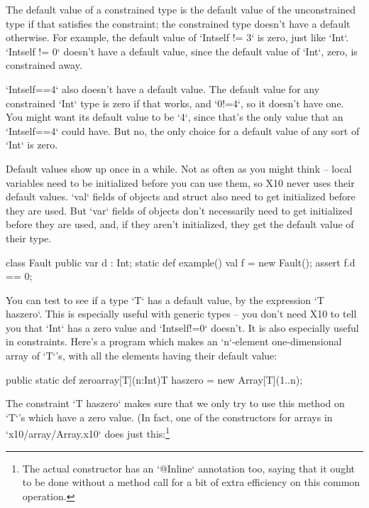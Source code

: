 The default value of a constrained type is the default value of the
unconstrained type if that satisfies the constraint; the constrained type
doesn't have a default otherwise. 
For example, the default value of \xcd`Int{self != 3}` is zero, just like
\xcd`Int`.  \xcd`Int{self != 0}` doesn't have a default value, since the
default value of \xcd`Int`, zero, is constrained away. 

\xcd`Int{self==4}` also doesn't have a default value.  The default value for
any constrained \xcd`Int` type is zero if that works, and \xcd`0!=4`, so it
doesn't have one.  You might want its default value to be \xcd`4`, since
that's the only value that an \xcd`Int{self==4}` could have. But no, the
only choice for a default value of any sort of \xcd`Int` is zero.


Default values show up once in a while.  Not as often as you might think --
local variables need to be initialized before you can use them, so X10 never
uses their default values.  \xcd`val` fields of objects and struct also need
to get initialized before they are used.  But \xcd`var` fields of objects
don't necessarily need to get initialized before they are used, and, if they
aren't initialized, they get the default value of their type.


\begin{xtennum}[]
 class Fault {
  public var d : Int;
  static def example() {
    val f = new Fault();
    assert f.d == 0; 
  }
}
\end{xtennum}


You can test to see if a type \xcd`T` has a default value, by the expression 
\xcd`T haszero`.   This is especially useful with generic types -- you don't
need X10 to tell you that \xcd`Int` has a zero value and \xcd`Int{self!=0}`
doesn't.  It is also especially useful in constraints.  Here's a program which
makes an \xcd`n`-element one-dimensional array of \xcd`T`'s, with all the
elements having their default value:
\begin{xtennum}[]
public static def zeroarray[T](n:Int){T haszero} 
  = new Array[T](1..n);
\end{xtennum}
The constraint \xcd`{T haszero}` makes sure that we only try to use this
method on \xcd`T`'s which have a zero value.  (In fact, one of the
constructors for arrays in \xcd`x10/array/Array.x10` does just
this:\footnote{The actual constructor has an \xcd`@Inline` annotation too,
saying that it ought to be done without a method call for a bit of extra
efficiency on this common operation.}
\begin{xten}
public final class Array[T] {
    // [lots of stuff omitted] 
    public def this(size:int) {T haszero}
\end{xten}

